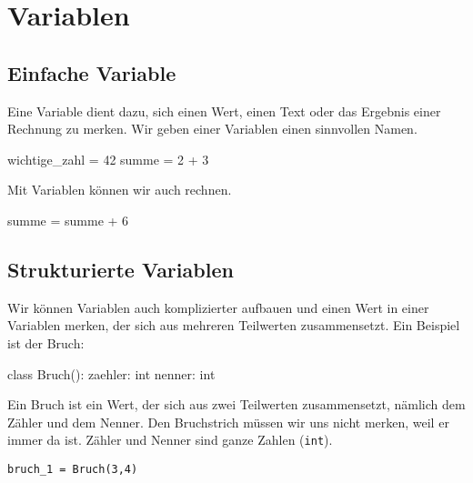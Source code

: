 \section{Variablen}

\subsection{Einfache Variable}

Eine Variable dient dazu, sich einen Wert, einen Text oder das Ergebnis einer Rechnung zu merken. Wir geben einer Variablen einen sinnvollen Namen.

\begin{codePython}
wichtige_zahl = 42
summe = 2 + 3
\end{codePython}

Mit Variablen können wir auch rechnen.

\begin{codePython}
summe = summe + 6
\end{codePython}

\subsection{Strukturierte Variablen}

Wir können Variablen auch komplizierter aufbauen und einen Wert in einer Variablen merken, der sich aus mehreren Teilwerten zusammensetzt. Ein Beispiel ist der Bruch:

\begin{codePython}
class Bruch():
	zaehler: int
	nenner: int
\end{codePython}

Ein Bruch ist ein Wert, der sich aus zwei Teilwerten zusammensetzt, nämlich dem Zähler und dem Nenner. Den Bruchstrich müssen wir uns nicht merken, weil er immer da ist. Zähler und Nenner sind ganze Zahlen (\texttt{int}).

\begin{lstlisting}
bruch_1 = Bruch(3,4)
\end{lstlisting}

